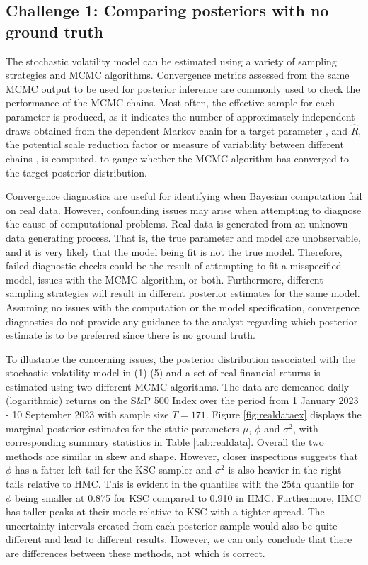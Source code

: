 \documentclass[12pt, a4paper]{article}
\begin{document}
\subsection{Challenge 1: Comparing posteriors with no ground truth}
    The stochastic volatility model can be estimated using a variety of sampling strategies and MCMC algorithms. Convergence metrics assessed from the same MCMC output to be used for posterior inference are commonly used to check the performance of the MCMC chains. Most often, the effective sample for each parameter is produced, as it indicates the number of approximately independent draws obtained from the dependent Markov chain for a target parameter \citep{gelman2013bayesian}, and $\hat{R}$, the potential scale reduction factor or measure of variability between different chains \citep{gelman1992inference}, is computed, to gauge whether the MCMC algorithm has converged to the target posterior distribution.

    Convergence diagnostics are useful for identifying when Bayesian computation fail on real data. However, confounding issues may arise when attempting to diagnose the cause of computational problems. Real data is generated from an unknown data generating process. That is, the true parameter and model are unobservable, and it is very likely that the model being fit is not the true model. Therefore, failed diagnostic checks could be the result of attempting to fit a misspecified model, issues with the MCMC algorithm, or both. Furthermore, different sampling strategies will result in different posterior estimates for the same model. Assuming no issues with the computation or the model specification, convergence diagnostics do not provide any guidance to the analyst regarding which posterior estimate is to be preferred since there is no ground truth.

    To illustrate the concerning issues, the posterior distribution associated with the stochastic volatility model in (1)-(5) and a set of real financial returns is estimated using two different MCMC algorithms. The data are demeaned daily (logarithmic) returns on the S\&P 500 Index over the period from 1 January 2023 - 10 September 2023 with sample size $T=171$. Figure \ref{fig:realdataex} displays the marginal posterior estimates for the static parameters $\mu$, $\phi$ and $\sigma^2$, with corresponding summary statistics in Table \ref{tab:realdata}. Overall the two methods are similar in skew and shape. However, closer inspections suggests that $\phi$ has a fatter left tail for the KSC sampler and $\sigma^2$ is also heavier in the right tails relative to HMC. This is evident in the quantiles with the 25th quantile for $\phi$ being smaller at 0.875 for KSC compared to 0.910 in HMC. Furthermore, HMC has taller peaks at their mode relative to KSC with a tighter spread. The uncertainty intervals created from each posterior sample would also be quite different and lead to different results. However, we can only conclude that there are differences between these methods, not which is correct.
    
\end{document}
